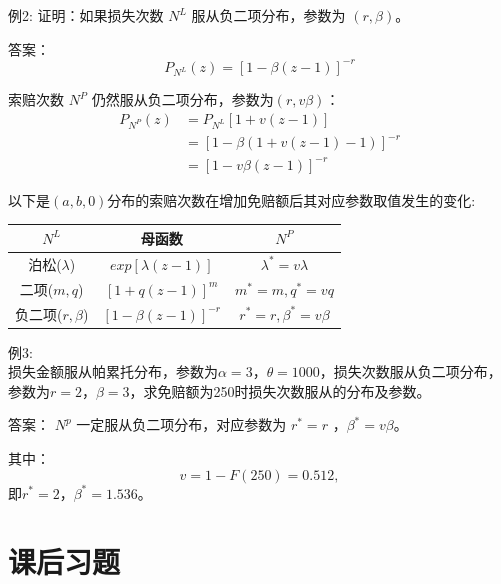 \documentclass[
]{book}
\begin{document}
例2:
证明：如果损失次数 \(N^L\) 服从负二项分布，参数为 \((r,\beta)\)。

答案：
\[
P_{N^L}(z)=[1-{\beta}{(z-1)}]^{-r}
\]

索赔次数 \(N^P\) 仍然服从负二项分布，参数为\((r,v\beta)\)：
\[
\begin{align*}
P_{N^P}(z)&=P_{N^L}[1+v(z-1)]\\
&=[1-\beta(1+v(z-1)-1)]^{-r}\\
&=[1-{v\beta}{(z-1)}]^{-r}
\end{align*}
\]

以下是\((a,b,0)\)分布的索赔次数在增加免赔额后其对应参数取值发生的变化:

\begin{longtable}[]{@{}ccc@{}}
\toprule
\(N^L\) & 母函数 & \(N^P\) \\
\midrule
\endhead
泊松(\(\lambda\)) & \(exp[\lambda (z-1)]\) & \(\lambda ^*=v\lambda\) \\
二项(\(m,q\)) & \({[1+q(z-1)]}^m\) & \(m^*=m,q^*=vq\) \\
负二项(\(r,\beta\)) & \({[1-\beta (z-1)]}^{-r}\) & \(r^*=r,\beta ^*=v\beta\) \\
\bottomrule
\end{longtable}

例3:\\
损失金额服从帕累托分布，参数为\(\alpha=3，\theta=1000\)，损失次数服从负二项分布，参数为\(r=2，\beta=3\)，求免赔额为250时损失次数服从的分布及参数。

答案：
\(N^p\) 一定服从负二项分布，对应参数为 \(r^* =r\) ，\(\beta^* = v\beta\)。

其中：
\[
v = 1-F(250)=0.512,
\]
即\(r^* =2\)，\(\beta^* = 1.536\)。

\hypertarget{ux8bfeux540eux4e60ux9898-2}{%
\section{课后习题}\label{ux8bfeux540eux4e60ux9898-2}}
\end{document}
